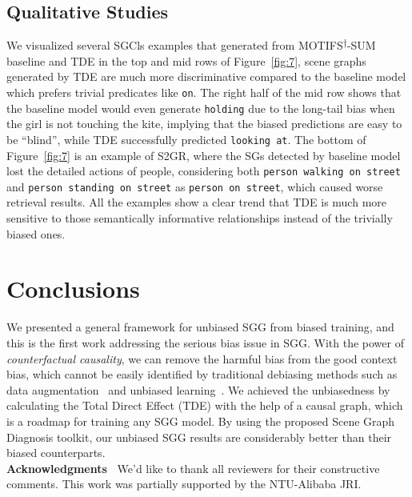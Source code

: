\documentclass[10pt,twocolumn,letterpaper]{article}
\begin{document}
\subsection{Qualitative Studies}
We visualized several SGCls examples that generated from MOTIFS\textsuperscript{$\dagger$}-SUM baseline and TDE in the top and mid rows of Figure~\ref{fig:7}, scene graphs generated by TDE are much more discriminative compared to the baseline model which prefers trivial predicates like \texttt{on}.  The right half of the mid row shows that the baseline model would even generate \texttt{holding} due to the long-tail bias when the girl is not touching the kite, implying that the biased predictions are easy to be ``blind'', while TDE successfully predicted \texttt{looking at}. The bottom of Figure~\ref{fig:7} is an example of S2GR, where the SGs detected by baseline model lost the detailed actions of people, considering both \texttt{person walking on street} and \texttt{person standing on street} as \texttt{person on street}, which caused worse retrieval results. All the examples show a clear trend that TDE is much more sensitive to those semantically informative relationships instead of the trivially biased ones.

\section{Conclusions}
We presented a general framework for unbiased SGG from biased training, and this is the first work addressing the serious bias issue in SGG. With the power of \emph{counterfactual causality}, we can remove the harmful bias from the good context bias, which cannot be easily identified by traditional debiasing methods such as data augmentation~\cite{geirhos2018imagenettrained, he2009learning} and unbiased learning~\cite{lin2017focal}. We achieved the unbiasedness by calculating the Total Direct Effect (TDE) with the help of a causal graph, which is a roadmap for training any SGG model. By using the proposed Scene Graph Diagnosis toolkit, our unbiased SGG results are considerably better than their biased counterparts.\\
\noindent\textbf{Acknowledgments~}
We'd like to thank all reviewers for their constructive comments. This work was partially supported by the NTU-Alibaba JRI.






 

{\small


}
\end{document}
